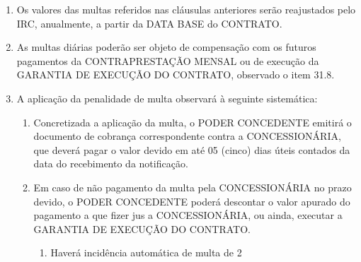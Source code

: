 \documentclass[a4paper,11pt]{report} %
\begin{document}
\begin{enumerate}
\begin{enumerate}[label*=\arabic*.]
\item \label{itm:ESX7} Multa mensal de R$ 460.000,00 (quatrocentos e sessenta mil reais), em função de descumprimento de cada marco-final previsto no CRONOGRAMA constante no ANEXO VI – CRONOGRAMA.

\item \label{itm:NJDQ} Multa no valor de R$ 3.000.000,00 (três milhões), no caso de obtenção, na forma do ANEXO VIII – SISTEMA DE MENSURAÇÃO DE DESEMPENHO E CÁLCULO DO PAGAMENTO DA CONCESSIONÁRIA., de “Índice de desempenho - ID” inferior à 50%
\end{enumerate}

\item \label{itm:JWAB} Os valores das multas referidos nas cláusulas anteriores serão reajustados pelo IRC, anualmente, a partir da DATA BASE do CONTRATO.
\item \label{itm:M7GT} As multas diárias poderão ser objeto de compensação com os futuros pagamentos da CONTRAPRESTAÇÃO MENSAL ou de execução da GARANTIA DE EXECUÇÃO DO CONTRATO, observado o item 31.8.

\item \label{itm:Y8H2} A aplicação da penalidade de multa observará à seguinte sistemática:

\begin{enumerate}[label*=\arabic*.]
\item \label{itm:NRBL} Concretizada a aplicação da multa, o PODER CONCEDENTE emitirá o documento de cobrança correspondente contra a CONCESSIONÁRIA, que deverá pagar o valor devido em até 05 (cinco) dias úteis contados da data do recebimento da notificação.

\item \label{itm:7DYT} Em caso de não pagamento da multa pela CONCESSIONÁRIA no prazo devido, o PODER CONCEDENTE poderá descontar o valor apurado do pagamento a que fizer jus a CONCESSIONÁRIA, ou ainda, executar a GARANTIA DE EXECUÇÃO DO CONTRATO.

\begin{enumerate}[label*=\arabic*.]
\item \label{itm:MM8G} Haverá incidência automática de multa de 2%
\end{enumerate}


\end{enumerate}
\end{enumerate}
\end{document}
